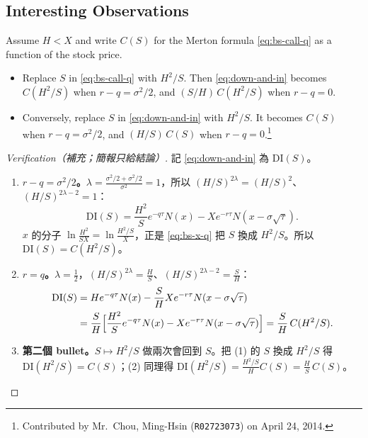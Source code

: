 \subsection{Interesting Observations}
\label{sec:barrier-reflection}


Assume $H<X$ and write $C(S)$ for the Merton formula \eqref{eq:bs-call-q} as a function of the stock price.
\begin{itemize}[itemsep=0.3em]
	\item Replace $S$ in \eqref{eq:bs-call-q} with $H^{2}/S$.
	      Then \eqref{eq:down-and-in} becomes $C(H^{2}/S)$ when $r-q=\sigma^{2}/2$, and $(S/H)\,C(H^{2}/S)$ when $r-q=0$.
	\item Conversely, replace $S$ in \eqref{eq:down-and-in} with $H^{2}/S$.
	      It becomes $C(S)$ when $r-q=\sigma^{2}/2$, and $(H/S)\,C(S)$ when $r-q=0$.\footnote{Contributed by Mr.~Chou, Ming-Hsin (\texttt{R02723073}) on April 24, 2014.}
\end{itemize}

\suppstart
{}

\begin{proof}[Verification（補充；簡報只給結論）]
	記 \eqref{eq:down-and-in} 為 $\mathrm{DI}(S)$。
	\begin{enumerate}[(1),nosep]
		\item \textbf{$r-q=\sigma^{2}/2$。}$\lambda=\frac{\sigma^{2}/2+\sigma^{2}/2}{\sigma^{2}}=1$，所以 $(H/S)^{2\lambda}=(H/S)^{2}$、$(H/S)^{2\lambda-2}=1$：
		\[
			\mathrm{DI}(S)=\frac{H^{2}}{S}e^{-q\tau}N(x)-Xe^{-r\tau}N(x-\sigma\sqrt{\tau}) .
		\]
		$x$ 的分子 $\ln\frac{H^{2}}{SX}=\ln\frac{H^{2}/S}{X}$，正是 \eqref{eq:bs-x-q} 把 $S$ 換成 $H^{2}/S$。所以 $\mathrm{DI}(S)=C(H^{2}/S)$。
		\item \textbf{$r=q$。}$\lambda=\frac12$，$(H/S)^{2\lambda}=\frac HS$、$(H/S)^{2\lambda-2}=\frac SH$：
		\[
			\begin{aligned}
				\mathrm{DI}(S) & =He^{-q\tau}N(x)-\frac{S}{H}Xe^{-r\tau}N(x-\sigma\sqrt{\tau})                                       \\
				               & =\frac{S}{H}\Bigl[\frac{H^{2}}{S}e^{-q\tau}N(x)-Xe^{-r\tau}N(x-\sigma\sqrt{\tau})\Bigr]=\frac SH\,C(H^{2}/S) .
			\end{aligned}
		\]
		\item \textbf{第二個 bullet。}$S\mapsto H^{2}/S$ 做兩次會回到 $S$。把 (1) 的 $S$ 換成 $H^{2}/S$ 得 $\mathrm{DI}(H^{2}/S)=C(S)$；(2) 同理得 $\mathrm{DI}(H^{2}/S)=\frac{H^{2}/S}{H}C(S)=\frac HS\,C(S)$。
	\end{enumerate}
\end{proof}
\suppend

